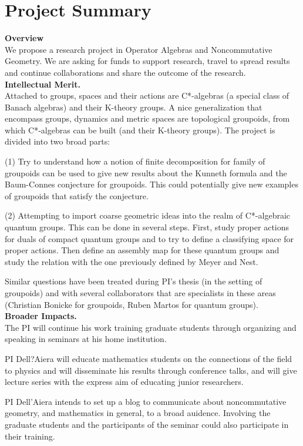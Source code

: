 \documentclass[11pt]{article}
\begin{document}
\section*{Project Summary}


\textbf{Overview}\\
We propose a research project in Operator Algebras and Noncommutative Geometry. We are asking for funds to support research, travel to spread results and continue collaborations and share the outcome of the research.\\

\noindent\textbf{Intellectual Merit.}\\
Attached to groups, spaces and their actions are C*-algebras (a special class of Banach algebras) and their K-theory groups. A nice generalization that encompass groups, dynamics and metric spaces are topological groupoids, from which C*-algebras can be built (and their K-theory groups). The project is divided into two broad parts:

(1) Try to understand how a notion of finite decomposition for family of groupoids can be used to give new results about the Kunneth formula and the Baum-Connes conjecture for groupoids. This could potentially give new examples of groupoids that satisfy the conjecture. 

(2) Attempting to import coarse geometric ideas into the realm of C*-algebraic quantum groups. This can be done in several steps. First, study proper actions for duals of compact quantum groups and to try to define a classifying space for proper actions. Then define an assembly map for these quantum groups and study the relation with the one previously defined by Meyer and Nest. 

Similar questions have been treated during PI's thesis (in the setting of groupoids) and with several collaborators that are specialists in these areas (Christian Bonicke for groupoids, Ruben Martos for quantum groups).
\\

\noindent\textbf{Broader Impacts.}\\
The PI will continue his work training graduate students through organizing and speaking in seminars at his home institution. 

PI Dell?Aiera will educate mathematics students on the connections of the field to physics and will disseminate his results
through conference talks, and will give lecture series with the express aim of educating junior researchers.

PI Dell'Aiera intends to set up a blog to communicate about noncommutative geometry, and mathematics in general, to a broad auidence. Involving the graduate students and the participants of the seminar could also participate in their training.
\end{document}
